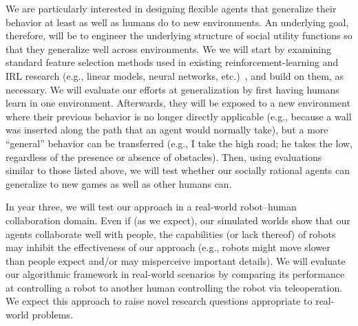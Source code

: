 We are particularly interested in designing flexible agents that
generalize their behavior at least as well as humans do to new
environments.
%
An underlying goal, therefore, will be to engineer the underlying
structure of social utility functions so that they generalize well
across environments.  We we will start by examining standard feature
selection methods used in existing reinforcement-learning and IRL
research (e.g., linear models, neural networks,
etc.)~\cite{diuk2009adaptive,kolter2009regularization,li2009reinforcement,parr2008analysis},
and build on them, as necessary.
%
We will evaluate our efforts at generalization by first having humans
learn in one environment.  Afterwards, they will be exposed to a new
environment where their previous behavior is no longer directly
applicable (e.g., because a wall was inserted along the path that an
agent would normally take), but a more ``general'' behavior can be
transferred (e.g., I take the high road; he takes the low, regardless
of the presence or absence of obstacles).  Then, using evaluations
similar to those listed above, we will test whether our socially
rational agents can generalize to new games as well as other humans
can.




In year three, we will test our approach in a real-world robot--human
collaboration domain.  Even if (as we expect), our simulated worlds
show that our agents collaborate well with people, the capabilities
(or lack thereof) of robots may inhibit the effectiveness of our
approach (e.g., robots might move slower than people expect and/or may
misperceive important details).  We will evaluate our algorithmic
framework in real-world scenarios by comparing its performance at
controlling a robot to another human controlling the robot via
teleoperation.  We expect this approach to raise novel research
questions appropriate to real-world problems.

